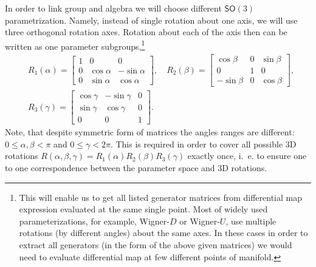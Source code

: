 \begin{example}
In order to link  group and algebra we will choose different
$\mathsf{SO}(3)$ parametrization. Namely, instead of single
rotation about one axis, we will use three orthogonal rotation
axes.  Rotation about each of the axis then can be written as one
parameter subgroups,\footnote{This will enable us to get all listed 
generator matrices from differential map expression evaluated at the same
single point. Most of widely used parameterizations, for example,
Wigner-$D$ or Wigner-$U$, use multiple rotations (by different
angles) about the same axes. In these cases in order to extract all
generators (in the form of the above given matrices) we would need to evaluate differential map at few
different points of manifold.}
\[
\begin{split}
& R_1(\alpha)=\begin{bmatrix}
1&0&0\\
0&\cos\alpha&-\sin\alpha\\
0&\sin\alpha&\cos\alpha
\end{bmatrix},\quad
R_2(\beta)=\begin{bmatrix}
\cos\beta&0&\sin\beta\\
0&1&0\\
-\sin\beta&0&\cos\beta
\end{bmatrix},\\
&R_3(\gamma)=\begin{bmatrix}
\cos\gamma&-\sin\gamma&0\\
\sin\gamma&\cos\gamma&0\\
0&0&1
\end{bmatrix}.
\end{split}
\]
Note, that despite symmetric form of matrices the angles ranges are
different: $0\le\alpha,\beta<\pi$ and $0\le\gamma< 2\pi$. This is
required in order to cover all possible 3D rotations $R(\alpha,
\beta,\gamma)=R_1(\alpha)R_2(\beta)R_3(\gamma)$ exactly once,
i.~e. to ensure one to one correspondence between the parameter space and 3D
rotations.


\end{example}
